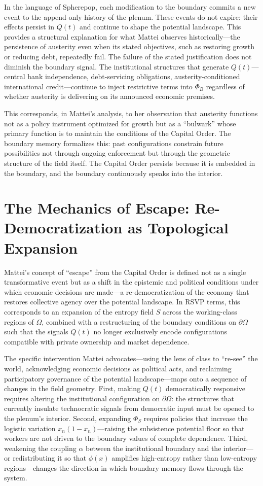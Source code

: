 \documentclass[12pt,a4paper]{article}
\begin{document}
In the language of Spherepop, each modification to the boundary commits a new event to the append-only history of the plenum. These events do not expire: their effects persist in $Q(t)$ and continue to shape the potential landscape. This provides a structural explanation for what Mattei observes historically---the persistence of austerity even when its stated objectives, such as restoring growth or reducing debt, repeatedly fail. The failure of the stated justification does not diminish the boundary signal. The institutional structures that generate $Q(t)$---central bank independence, debt-servicing obligations, austerity-conditioned international credit---continue to inject restrictive terms into $\Phi_B$ regardless of whether austerity is delivering on its announced economic premises.

This corresponds, in Mattei's analysis, to her observation that austerity functions not as a policy instrument optimized for growth but as a ``bulwark'' whose primary function is to maintain the conditions of the Capital Order. The boundary memory formalizes this: past configurations constrain future possibilities not through ongoing enforcement but through the geometric structure of the field itself. The Capital Order persists because it is embedded in the boundary, and the boundary continuously speaks into the interior.

\section{The Mechanics of Escape: Re-Democratization as Topological Expansion}

Mattei's concept of ``escape'' from the Capital Order is defined not as a single transformative event but as a shift in the epistemic and political conditions under which economic decisions are made---a re-democratization of the economy that restores collective agency over the potential landscape. In RSVP terms, this corresponds to an expansion of the entropy field $S$ across the working-class regions of $\Omega$, combined with a restructuring of the boundary conditions on $\partial\Omega$ such that the signals $Q(t)$ no longer exclusively encode configurations compatible with private ownership and market dependence.

The specific intervention Mattei advocates---using the lens of class to ``re-see'' the world, acknowledging economic decisions as political acts, and reclaiming participatory governance of the potential landscape---maps onto a sequence of changes in the field geometry. First, making $Q(t)$ democratically responsive requires altering the institutional configuration on $\partial\Omega$: the structures that currently insulate technocratic signals from democratic input must be opened to the plenum's interior. Second, expanding $\Phi_S$ requires policies that increase the logistic variation $x_n(1-x_n)$---raising the subsistence potential floor so that workers are not driven to the boundary values of complete dependence. Third, weakening the coupling $\alpha$ between the institutional boundary and the interior---or redistributing it so that $\phi(x)$ amplifies high-entropy rather than low-entropy regions---changes the direction in which boundary memory flows through the system.
\end{document}

